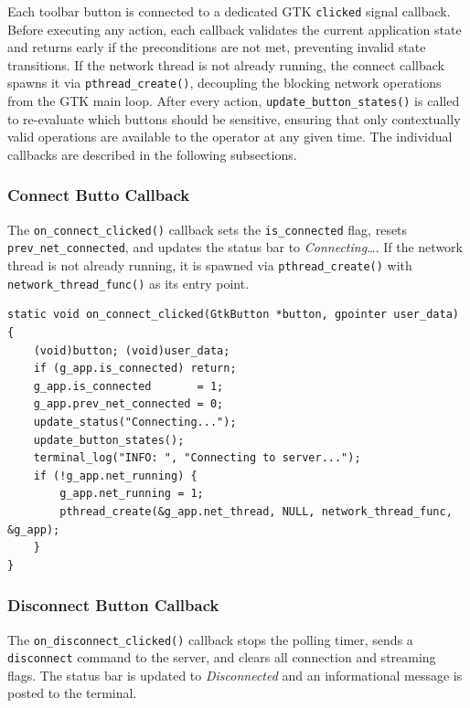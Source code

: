Each toolbar button is connected to a dedicated GTK \texttt{clicked}
signal callback. Before executing any action, each callback validates
the current application state and returns early if the preconditions are
not met, preventing invalid state transitions. If the network thread is
not already running, the connect callback spawns it via
\texttt{pthread\_create()}, decoupling the blocking network operations
from the GTK main loop. After every action,
\texttt{update\_button\_states()} is called to re-evaluate which buttons
should be sensitive, ensuring that only contextually valid operations are
available to the operator at any given time. The individual callbacks are
described in the following subsections.


\subsubsection{Connect Butto Callback}

The \texttt{on\_connect\_clicked()} callback sets the
\texttt{is\_connected} flag, resets \texttt{prev\_net\_connected}, and
updates the status bar to \emph{Connecting\ldots}. If the network thread
is not already running, it is spawned via \texttt{pthread\_create()}
with \texttt{network\_thread\_func()} as its entry point.

\begin{verbatim}
static void on_connect_clicked(GtkButton *button, gpointer user_data) {
    (void)button; (void)user_data;
    if (g_app.is_connected) return;
    g_app.is_connected       = 1;
    g_app.prev_net_connected = 0;
    update_status("Connecting...");
    update_button_states();
    terminal_log("INFO: ", "Connecting to server...");
    if (!g_app.net_running) {
        g_app.net_running = 1;
        pthread_create(&g_app.net_thread, NULL, network_thread_func, &g_app);
    }
}
\end{verbatim}

\subsubsection{Disconnect Button Callback}

The \texttt{on\_disconnect\_clicked()} callback stops the polling timer,
sends a \texttt{disconnect} command to the server, and clears all
connection and streaming flags. The status bar is updated to
\emph{Disconnected} and an informational message is posted to the
terminal.

